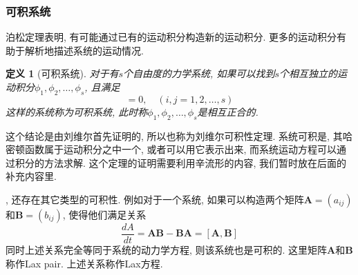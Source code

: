 \documentclass[a4paper,11pt]{article}
\newtheorem{definition}{\hspace{2em}定义}[section]
\begin{document}
\subsubsection{可积系统}
泊松定理表明, 有可能通过已有的运动积分构造新的运动积分. 更多的运动积分有助于解析地描述系统的运动情况.
\begin{definition}[可积系统]
  对于有$s$个自由度的力学系统, 如果可以找到$s$个相互独立的运动积分$\phi_1,\phi_2,\dots,\phi_s$, 且满足
\begin{equation*}
  [\phi_i,\phi_j]=0,\quad(i,j=1,2,\dots,s)
\end{equation*}
这样的系统称为可积系统, 此时称$\phi_1,\phi_2,\dots,\phi_s$是相互正合的.
\end{definition}
这个结论是由刘维尔首先证明的, 所以也称为刘维尔可积性定理. 系统可积是, 其哈密顿函数属于运动积分之中一个, 或者可以用它表示出来, 而系统运动方程可以通过积分的方法求解. 这个定理的证明需要利用辛流形的内容, 我们暂时放在后面的补充内容里.

, 还存在其它类型的可积性. 例如对于一个系统, 如果可以构造两个矩阵$\mathbf{A}=(a_{ij})$和$\mathbf{B}=(b_{ij})$, 使得他们满足关系
\begin{equation*}
  \frac{dA}{dt}=\mathbf{A}\mathbf{B}-\mathbf{B}\mathbf{A}=[\mathbf{A},\mathbf{B}]
\end{equation*}
同时上述关系完全等同于系统的动力学方程, 则该系统也是可积的. 这里矩阵$\mathbf{A}$和$\mathbf{B}$称作Lax pair. 上述关系称作Lax方程.
\end{document}
